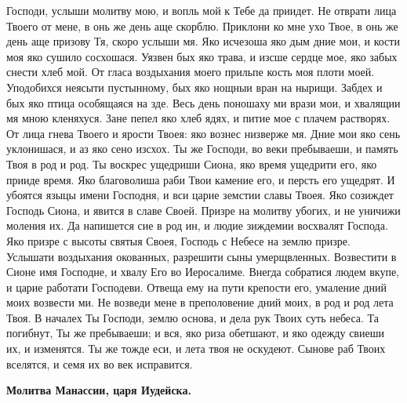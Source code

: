 Господи, услыши молитву мою, и вопль мой к Тебе да приидет. Не отврати лица Твоего от мене, в онь же день аще скорблю. Приклони ко мне ухо Твое, в онь же  день аще призову Тя, скоро услыши мя. Яко исчезоша яко дым дние мои, и кости моя яко сушило сосхошася. Уязвен бых яко трава, и изсше сердце мое, яко забых снести хлеб мой. От гласа воздыхания моего прильпе кость моя плоти моей. Уподобихся неясыти пустынному, бых яко нощныи вран на нырищи. Забдех и бых яко птица особящаяся на зде. Весь день поношаху ми врази мои, и хвалящии мя мною кленяхуся. Зане пепел яко хлеб ядях, и питие мое с плачем растворях. От лица гнева Твоего и ярости Твоея: яко вознес низверже мя. Дние мои яко сень уклонишася, и аз яко сено изсхох. Ты же Господи, во веки пребываеши, и память Твоя в род и род. Ты воскрес ущедриши Сиона, яко время ущедрити его, яко прииде время. Яко благоволиша раби Твои камение его, и персть его ущедрят. И убоятся языцы имени Господня, и вси царие земстии славы Твоея. Яко созиждет Господь Сиона, и явится в славе Своей. Призре на молитву убогих, и не уничижи моления их. Да напишется сие в род ин, и людие зиждемии восхвалят Господа. Яко призре с высоты святыя Своея, Господь с Небесе на землю призре. Услышати воздыхания окованных, разрешити сыны умерщвленных. Возвестити в Сионе имя Господне, и хвалу Его во Иеросалиме. Внегда собратися людем вкупе, и царие  работати Господеви. Отвеща ему на пути крепости его, умаление дний моих возвести ми. Не возведи мене в преполовение дний моих, в род и род лета Твоя. В началех Ты Господи, землю основа, и дела рук Твоих суть небеса. Та погибнут, Ты же пребываеши; и вся, яко риза обетшают, и яко одежду  свиеши их, и изменятся. Ты же тожде еси, и лета твоя не оскудеют. Сынове раб Твоих вселятся, и семя их во век исправится.


\medskip


\bfseries Молитва Манассии, царя Иудейска.\normalfont{}


